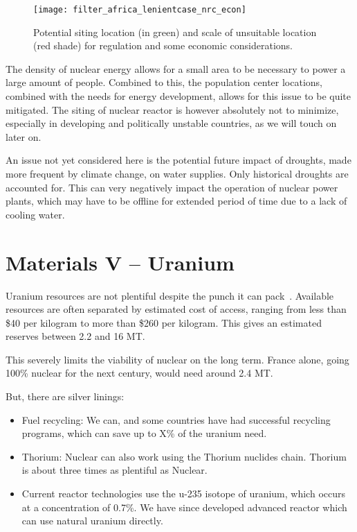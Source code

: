 \begin{figure}[h]
	\texttt{[image: filter\_africa\_lenientcase\_nrc\_econ]}
	\caption[Potential siting location (in green) and scale of unsuitable location (red shade) for regulation and some economic considerations]{Potential siting location (in green) and scale of unsuitable location (red shade) for regulation and some economic considerations.}
\end{figure}

The density of nuclear energy allows for a small area to be necessary to power a large amount of people. Combined to this, the population center locations, combined with the needs for energy development, allows for this issue to be quite mitigated. The siting of nuclear reactor is however absolutely not to minimize, especially in developing and politically unstable countries, as we will touch on later on.

An issue not yet considered here is the potential future impact of droughts, made more frequent by climate change, on water supplies. Only historical droughts are accounted for. This can very negatively impact the operation of nuclear power plants, which may have to be offline for extended period of time due to a lack of cooling water.

\section{Materials V -- Uranium}

Uranium resources are not plentiful despite the punch it can pack~. Available resources are often separated by estimated cost of access, ranging from less than \$40 per kilogram to more than \$260 per kilogram. This gives an estimated reserves between 2.2 and 16 MT.

This severely limits the viability of nuclear on the long term. France alone, going 100\% nuclear for the next century, would need around 2.4 MT.

But, there are silver linings:

\begin{itemize}
\item Fuel recycling: We can, and some countries have had successful recycling programs, which can save up to X\% of the uranium need.
\item Thorium: Nuclear can also work using the Thorium nuclides chain. Thorium is about three times as plentiful as Nuclear.
\item Current reactor technologies use the u-235 isotope of uranium, which occurs at a concentration of 0.7\%. We have since developed advanced reactor which can use natural uranium directly.
\end{itemize}

